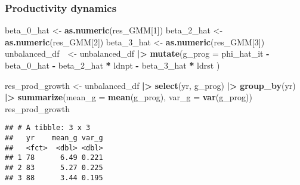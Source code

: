 \documentclass[
]{article}
\newenvironment{Shaded}{\begin{snugshade}}{\end{snugshade}}
\newcommand{\AttributeTok}[1]{\textcolor[rgb]{0.13,0.29,0.53}{#1}}
\newcommand{\DecValTok}[1]{\textcolor[rgb]{0.00,0.00,0.81}{#1}}
\newcommand{\FunctionTok}[1]{\textcolor[rgb]{0.13,0.29,0.53}{\textbf{#1}}}
\newcommand{\NormalTok}[1]{#1}
\newcommand{\OtherTok}[1]{\textcolor[rgb]{0.56,0.35,0.01}{#1}}
\newcommand{\SpecialCharTok}[1]{\textcolor[rgb]{0.81,0.36,0.00}{\textbf{#1}}}
\begin{document}
\hypertarget{productivity-dynamics}{%
\subsubsection{Productivity dynamics}\label{productivity-dynamics}}

\begin{Shaded}
\begin{Highlighting}[]
\NormalTok{beta\_0\_hat }\OtherTok{\textless{}{-}} \FunctionTok{as.numeric}\NormalTok{(res\_GMM[}\DecValTok{1}\NormalTok{])}
\NormalTok{beta\_2\_hat }\OtherTok{\textless{}{-}} \FunctionTok{as.numeric}\NormalTok{(res\_GMM[}\DecValTok{2}\NormalTok{])}
\NormalTok{beta\_3\_hat }\OtherTok{\textless{}{-}} \FunctionTok{as.numeric}\NormalTok{(res\_GMM[}\DecValTok{3}\NormalTok{])}
\NormalTok{unbalanced\_df　}\OtherTok{\textless{}{-}}\NormalTok{ unbalanced\_df }\SpecialCharTok{|\textgreater{}}
  \FunctionTok{mutate}\NormalTok{(}\AttributeTok{g\_prog =}\NormalTok{ phi\_hat\_it }\SpecialCharTok{{-}}\NormalTok{ beta\_0\_hat }\SpecialCharTok{{-}}\NormalTok{ beta\_2\_hat }\SpecialCharTok{*}\NormalTok{ ldnpt }\SpecialCharTok{{-}}\NormalTok{ beta\_3\_hat }\SpecialCharTok{*}\NormalTok{ ldrst}
\NormalTok{        )}

\NormalTok{res\_prod\_growth }\OtherTok{\textless{}{-}}\NormalTok{ unbalanced\_df }\SpecialCharTok{|\textgreater{}}
  \FunctionTok{select}\NormalTok{(yr, g\_prog) }\SpecialCharTok{|\textgreater{}}
  \FunctionTok{group\_by}\NormalTok{(yr) }\SpecialCharTok{|\textgreater{}}
  \FunctionTok{summarize}\NormalTok{(}\AttributeTok{mean\_g =} \FunctionTok{mean}\NormalTok{(g\_prog), }\AttributeTok{var\_g =} \FunctionTok{var}\NormalTok{(g\_prog))}
\NormalTok{res\_prod\_growth}
\end{Highlighting}
\end{Shaded}

\begin{verbatim}
## # A tibble: 3 x 3
##   yr    mean_g var_g
##   <fct>  <dbl> <dbl>
## 1 78      6.49 0.221
## 2 83      5.27 0.225
## 3 88      3.44 0.195
\end{verbatim}
\end{document}
